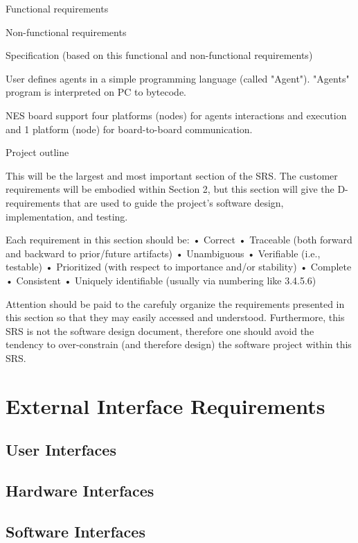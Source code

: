 \documentclass{scrreprt}
\begin{document}
Functional requirements

Non-functional requirements


Specification (based on this functional and non-functional requirements)



User defines agents in a simple programming language (called "Agent").
"Agents" program is interpreted on PC to bytecode.

NES board support four platforms (nodes) for agents interactions and execution and 1 platform (node) for board-to-board communication.



Project outline

This will be the largest and most important section of the SRS.  The customer requirements will be embodied within Section 2, but this section will give the D-requirements that are used to guide the project’s software design, implementation, and testing.

Each requirement in this section should be:
•	Correct
•	Traceable (both forward and backward to prior/future artifacts)
•	Unambiguous
•	Verifiable (i.e., testable)
•	Prioritized (with respect to importance and/or stability)
•	Complete
•	Consistent
•	Uniquely identifiable (usually via numbering like 3.4.5.6)

Attention should be paid to the carefuly organize the requirements presented in this section so that they may easily accessed and understood.  Furthermore, this SRS is not the software design document, therefore one should avoid the tendency to over-constrain (and therefore design) the software project within this SRS.

	\section{External Interface Requirements}

		\subsection{User Interfaces}

		\subsection{Hardware Interfaces}

		\subsection{Software Interfaces}
\end{document}
